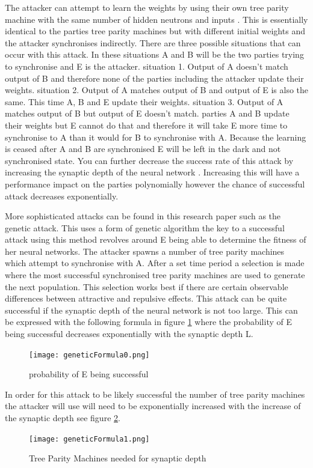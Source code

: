 The attacker can attempt to learn the weights by using their own tree parity machine with the same number of hidden neutrons and inputs \cite{Private_Inputs_to_Tree_Parity_Machine}. This is essentially identical to the parties tree parity machines but with different initial weights and the attacker synchronises indirectly.
There are three possible situations that can occur with this attack. In these situations A and B will be the two parties trying to synchronise and E is the attacker.
situation 1. Output of A doesn't match output of B and therefore none of the parties including the attacker update their weights.
situation 2. Output of A matches output of B and output of E is also the same. This time A, B and E update their weights.
situation 3. Output of A matches output of B but output of E doesn't match. parties A and B update their weights but E cannot do that and therefore it will take E more time to synchronise to A than it would for B to synchronise with A. Because the learning is ceased after A and B are synchronised E will be left in the dark and not synchronised state. You can further decrease the success rate of this attack by increasing the synaptic depth of the neural network \cite{Private_Inputs_to_Tree_Parity_Machine}. Increasing this will have a performance impact on the parties polynomially however the chance of successful attack decreases exponentially.

More sophisticated attacks can be found in this research paper \cite{BIG_ResearchPaper} such as the genetic attack.
This uses a form of genetic algorithm the key to a successful attack using this method revolves around E being able to determine the fitness of her neural networks.
The attacker spawns a number of tree parity machines which attempt to synchronise with A. After a set time period a selection is made where the most successful synchronised tree parity machines are used to generate the next population. This selection works best if there are certain observable differences between attractive and repulsive effects. 
This attack can be quite successful if the synaptic depth of the neural network is not too large. This can be expressed with the following formula in figure \ref{fig:geneticESuccess} where the probability of E being successful decreases exponentially with the synaptic depth L.
\begin{figure}[ht]
  \centering
      \texttt{[image: geneticFormula0.png]}
  \caption[probability of E being successful]{probability of E being successful\cite{BIG_ResearchPaper}}
  \label{fig:geneticESuccess}
\end{figure}

In order for this attack to be likely successful the number of tree parity machines the attacker will use will need to be exponentially increased with the increase of the synaptic depth see figure \ref{fig:geneticEMachine}.
\begin{figure}[ht]
  \centering
      \texttt{[image: geneticFormula1.png]}
  \caption[Tree Parity Machines needed for synaptic depth]{Tree Parity Machines needed for synaptic depth\cite{BIG_ResearchPaper}}
  \label{fig:geneticEMachine}
\end{figure}
